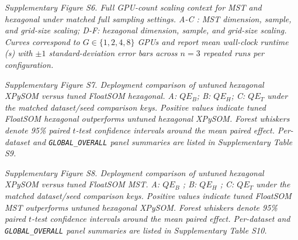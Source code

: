 \documentclass[
]{article}
\makeatletter
\newcommand*\pandocbounded[1]{%
  \sbox\pandoc@box{#1}%
  \Gscale@div\@tempa{\textheight}{\dimexpr\ht\pandoc@box+\dp\pandoc@box\relax}%
  \Gscale@div\@tempb{\linewidth}{\wd\pandoc@box}%
  \ifdim\@tempb\p@<\@tempa\p@\let\@tempa\@tempb\fi%
  \ifdim\@tempa\p@<\p@\scalebox{\@tempa}{\usebox\pandoc@box}%
  \else\usebox{\pandoc@box}%
  \fi%
}
\providecommand{\DIFadd}[1]{{\protect\color{blue} #1}} %
\providecommand{\DIFaddbegin}{} %
\providecommand{\DIFaddend}{} %
\makeatother
\begin{document}
\pandocbounded{}
\emph{Supplementary Figure S6.  \DIFaddbegin \DIFadd{Full GPU-count scaling context for MST
and hexagonal }\DIFaddend under \DIFaddbegin \DIFadd{matched }\DIFaddend full sampling  \DIFaddbegin \DIFadd{settings}\DIFaddend .  A-C \DIFaddbegin \DIFadd{: MST dimension}\DIFaddend ,
 \DIFaddbegin \DIFadd{sample}\DIFaddend , and  \DIFaddbegin \DIFadd{grid-size scaling; D-F: hexagonal dimension, sample, and
grid-size scaling}\DIFaddend . \DIFaddbegin \DIFadd{Curves correspond to \(G\in\{1,2,4,8\}\) GPUs and
report mean wall-clock runtime (s) with \(\pm 1\) standard-deviation
error bars across \(n=3\) repeated runs per configuration.}\DIFaddend }

\pandocbounded{}
\emph{Supplementary Figure S7.  \DIFaddbegin \DIFadd{Deployment comparison of untuned
hexagonal XPySOM }\DIFaddend versus  \DIFaddbegin \DIFadd{tuned FloatSOM hexagonal}\DIFaddend .  \DIFaddbegin \DIFadd{A: \(QE_B\); B:
\(QE_H\); C: \(QE_T\) under }\DIFaddend the matched  \DIFaddbegin \DIFadd{dataset/seed comparison keys.
Positive values indicate tuned FloatSOM hexagonal outperforms untuned
hexagonal XPySOM. Forest whiskers denote 95\% }\DIFaddend paired  \DIFaddbegin \DIFadd{\(t\)-test
confidence intervals around the mean paired effect. Per-dataset }\DIFaddend and
 \DIFaddbegin \DIFadd{\texttt{GLOBAL\_OVERALL} panel summaries are listed in Supplementary
Table S9}\DIFaddend .}

\pandocbounded{}
\emph{Supplementary Figure S8.  \DIFaddbegin \DIFadd{Deployment }\DIFaddend comparison  \DIFaddbegin \DIFadd{of untuned
}\DIFaddend hexagonal  \DIFaddbegin \DIFadd{XPySOM versus tuned FloatSOM MST. A: }\DIFaddend \(QE_B\) \DIFaddbegin \DIFadd{; B: }\DIFaddend \(QE_H\) \DIFaddbegin \DIFadd{; C:
}\DIFaddend \(QE_T\) under the matched  \DIFaddbegin \DIFadd{dataset/seed comparison }\DIFaddend keys. Positive values
indicate  tuned  \DIFaddbegin \DIFadd{FloatSOM MST }\DIFaddend outperforms  untuned  \DIFaddbegin \DIFadd{hexagonal XPySOM}\DIFaddend . Forest
whiskers denote 95\% paired \(t\)-test confidence intervals around the
mean paired effect. \DIFaddbegin \DIFadd{Per-dataset and \texttt{GLOBAL\_OVERALL} panel
summaries are listed in Supplementary Table S10.}\DIFaddend }
\end{document}
